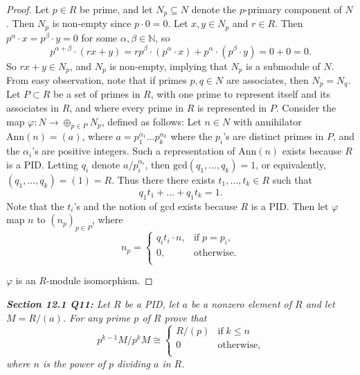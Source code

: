 \documentclass{article}
\begin{document}
  \begin{proof}
    Let $p\in R$ be prime, and let $N_p\subseteq N$ denote the $p$-primary
    component of $N$. Then $N_p$ is non-empty since $p\cdot0=0$. Let
    $x,y\in N_p$ and $r\in R$. Then $p^\alpha\cdot x=p^\beta\cdot y=0$ for
    some $\alpha,\beta\in\mathbb{N}$, so
    \[p^{\alpha+\beta}\cdot(rx+y) =rp^\beta\cdot(p^\alpha\cdot
    x)+p^\alpha\cdot(p^\beta\cdot y) =0+0=0.\]
    So $rx+y\in N_p$, and $N_p$ is non-empty, implying that $N_p$ is a
    submodule of $N$. \\

    From easy observation, note that if primes $p,q\in N$ are associates,
    then $N_p=N_q$. Let $P\subset R$ be a set of primes in $R$, with one
    prime to represent itself and its associates in $R$, and where every
    prime in $R$ is represented in $P$. Consider the map
    $\varphi:N\rightarrow \oplus_{p\in P}N_p$, defined as follows: Let
    $n\in N$ with annihilator $\text{Ann}(n)=(a)$, where
    $a=p_1^{\alpha_1}\ldots p_k^{\alpha_k}$ where the $p_i$'s are distinct
    primes in $P$, and the $\alpha_i$'s are positive integers. Such a
    representation of $\text{Ann}(n)$ exists because $R$ is a PID. Letting
    $q_i$ denote $a/p_i^{\alpha_i}$, then $\text{gcd}(q_1,\ldots,q_k)=1$,
    or equivalently, $(q_1,\ldots,q_k)=(1)=R$. Thus there there exists
    $t_1,\ldots,t_k\in R$ such that \[q_1t_1+\ldots+q_1t_k=1.\] Note that
    the $t_i$'s and the notion of gcd exists because $R$ is a PID. Then let
    $\varphi$ map $n$ to $(n_p)_{p\in P}$, where
    \begin{equation*}
      n_p=
      \begin{cases}
        q_it_i\cdot n, &\text{if}\; p=p_i,\\
        0, &\text{otherwise}. \\
      \end{cases}
    \end{equation*}

    $\varphi$ is an $R$-module isomorphism.
  \end{proof}

\it \textbf{Section 12.1 Q11:} Let $R$ be a PID, let $a$ be a nonzero
  element of $R$ and let $M=R/(a)$. For any prime $p$ of $R$ prove that
  \begin{equation*}
    p^{k-1}M/p^kM\cong
    \begin{cases}
      R/(p) &\text{if}\; k\leq n\\
      0 &\text{otherwise},\\
    \end{cases}
  \end{equation*}
  where $n$ is the power of $p$ dividing $a$ in $R$.
\end{document}
